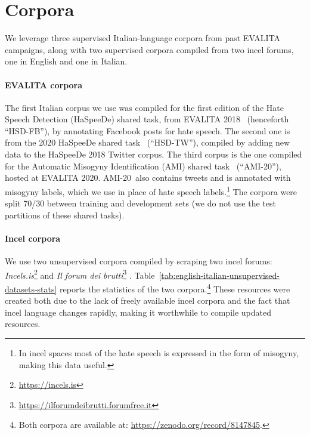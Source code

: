 \documentclass[11pt]{article}
\newcommand{\hsdfb}{\mbox{HSD-FB}}
\newcommand{\hsdtw}{\mbox{HSD-TW}}
\newcommand{\ami}{\mbox{AMI-20}}
\newcommand{\enforum}{\textit{Incels.is}}
\newcommand{\itforum}{\textit{Il forum dei brutti}}
\begin{document}
\section{Corpora}
\label{sec:corpora}

We leverage three supervised Italian-language corpora from past EVALITA
campaigns, along with two supervised corpora compiled from two incel forums, one in English and one in Italian.

\paragraph{EVALITA corpora}
The first Italian corpus we use was compiled for the first edition of the Hate Speech Detection (HaSpeeDe) shared task, from EVALITA 2018~\cite{boscoOverviewEVALITA2018} (henceforth ``\hsdfb''), by annotating Facebook posts for hate speech. The second one is from the 2020 HaSpeeDe shared task~\cite{basileEVALITA2020Overview} (``\hsdtw''), compiled by adding new data to the HaSpeeDe 2018 Twitter corpus. The third corpus is the one compiled for the Automatic Misogyny Identification (AMI) shared task~\cite{fersiniAMIEVALITA2020Automatic2020} (``\ami''), hosted at EVALITA 2020. \ami\, also contains tweets and is annotated with misogyny labels, which we use in place of hate speech labels.\footnote{In incel spaces most of the hate speech is expressed in the form of misogyny, making this data useful.}
The corpora were split 70/30 between training and development sets (we do not use the test partitions of these shared tasks).

\paragraph{Incel corpora}
We use two unsupervised corpora compiled by scraping two incel forums: \textit{\enforum}\footnote{\url{https://incels.is}} and \textit{\itforum}\footnote{\url{https://ilforumdeibrutti.forumfree.it}} \cite{gajo2023identification}.
Table~\ref{tab:english-italian-unsupervised-datasets-stats} reports the statistics of the two corpora.\footnote{Both corpora are available at: \url{https://zenodo.org/record/8147845}.}
These resources were created both due to the lack of freely available incel corpora and the fact that incel language changes rapidly,
making it worthwhile to compile updated resources.
\end{document}
